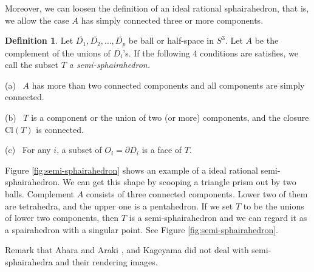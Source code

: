 \documentclass[suppldata, dvipdfmx]{interact}
\theoremstyle{plain}%
\theoremstyle{definition}
\newtheorem{definition}[theorem]{Definition}
\theoremstyle{remark}
\theoremstyle{problemstyle}
\begin{document}

Moreover, we can loosen the definition of an ideal rational sphairahedron, 
that is, we allow the case $A$ has simply connected three or more components.

\begin{definition}
Let $\overline{D_1}, \overline{D_2},\ldots, \overline{D_p}$ be ball or
half-space in $S^3$.  Let $A$ be the complement of the unions of
$\overline{D_i}$'s.  If the following 4 conditions are satisfies, we call the subset $T$ {\it a semi-sphairahedron.}\par
(a) \ $A$ has more than two connected components and all
components are simply connected. \par 
(b) \ $T$ is a component or the union of two (or more) components, and the closure $\text{Cl}(T)$ is connected. \par
(c) \ For any $i$, a subset of $O_i=\partial \overline{D_i}$ is a face of $T$.
\end{definition}
Figure \ref{fig:semi-sphairahedron} shows an
example of a ideal rational semi-sphairahedron.  We can get this shape by scooping a
triangle prism out by two balls.  Complement $A$ consists of three
connected components. Lower two of them are tetrahedra, and the upper 
one is a pentahedron.  If we set $T$ to be the unions of lower two components,  
then $T$ is a semi-sphairahedron and we can regard it as a spairahedron with a singular point.  See Figure \ref{fig:semi-sphairahedron}.


Remark that Ahara and Araki \cite{AharaAraki},
and Kageyama \cite{kageyama} did not deal with semi-sphairahedra and their rendering images.
\end{document}
